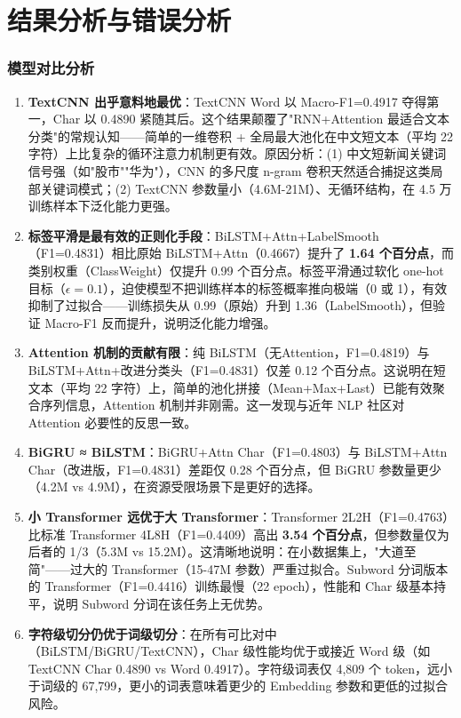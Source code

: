 \chapter{结果分析与错误分析}

\subsection{模型对比分析}

\begin{enumerate}
\item \textbf{TextCNN 出乎意料地最优}：TextCNN Word 以 Macro-F1=0.4917 夺得第一，Char 以 0.4890 紧随其后。这个结果颠覆了"RNN+Attention 最适合文本分类"的常规认知——简单的一维卷积 + 全局最大池化在中文短文本（平均 22 字符）上比复杂的循环注意力机制更有效。原因分析：(1) 中文短新闻关键词信号强（如"股市""华为"），CNN 的多尺度 n-gram 卷积天然适合捕捉这类局部关键词模式；(2) TextCNN 参数量小（4.6M-21M）、无循环结构，在 4.5 万训练样本下泛化能力更强。

\item \textbf{标签平滑是最有效的正则化手段}：BiLSTM+Attn+LabelSmooth（F1=0.4831）相比原始 BiLSTM+Attn（0.4667）提升了 \textbf{1.64 个百分点}，而类别权重（ClassWeight）仅提升 0.99 个百分点。标签平滑通过软化 one-hot 目标（$\epsilon=0.1$），迫使模型不把训练样本的标签概率推向极端（0 或 1），有效抑制了过拟合——训练损失从 0.99（原始）升到 1.36（LabelSmooth），但验证 Macro-F1 反而提升，说明泛化能力增强。

\item \textbf{Attention 机制的贡献有限}：纯 BiLSTM（无Attention，F1=0.4819）与 BiLSTM+Attn+改进分类头（F1=0.4831）仅差 0.12 个百分点。这说明在短文本（平均 22 字符）上，简单的池化拼接（Mean+Max+Last）已能有效聚合序列信息，Attention 机制并非刚需。这一发现与近年 NLP 社区对 Attention 必要性的反思一致。

\item \textbf{BiGRU ≈ BiLSTM}：BiGRU+Attn Char（F1=0.4803）与 BiLSTM+Attn Char（改进版，F1=0.4831）差距仅 0.28 个百分点，但 BiGRU 参数量更少（4.2M vs 4.9M），在资源受限场景下是更好的选择。

\item \textbf{小 Transformer 远优于大 Transformer}：Transformer 2L2H（F1=0.4763）比标准 Transformer 4L8H（F1=0.4409）高出 \textbf{3.54 个百分点}，但参数量仅为后者的 1/3（5.3M vs 15.2M）。这清晰地说明：在小数据集上，"大道至简"——过大的 Transformer（15-47M 参数）严重过拟合。Subword 分词版本的 Transformer（F1=0.4416）训练最慢（22 epoch），性能和 Char 级基本持平，说明 Subword 分词在该任务上无优势。

\item \textbf{字符级切分仍优于词级切分}：在所有可比对中（BiLSTM/BiGRU/TextCNN），Char 级性能均优于或接近 Word 级（如 TextCNN Char 0.4890 vs Word 0.4917）。字符级词表仅 4,809 个 token，远小于词级的 67,799，更小的词表意味着更少的 Embedding 参数和更低的过拟合风险。
\end{enumerate}


